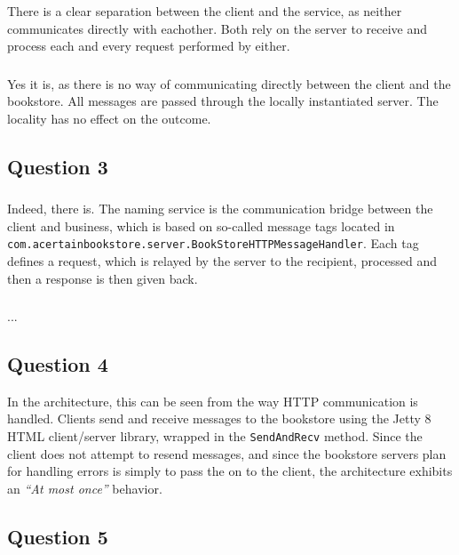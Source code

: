 \subsubsection{}
There is a clear separation between the client and the service, as neither
communicates directly with eachother. Both rely on the server to receive and
process each and every request performed by either.

\subsubsection{}
Yes it is, as there is no way of communicating directly between the client and
the bookstore. All messages are passed through the locally instantiated server.
The locality has no effect on the outcome.

\subsection{Question 3}

\subsubsection{}
Indeed, there is. The naming service is the communication bridge between the
client and business, which is based on so-called message tags located in \\
{\tt com.acertainbookstore.server.BookStoreHTTPMessageHandler}. Each tag defines
a request, which is relayed by the server to the recipient, processed and then
a response is then given back.

\subsubsection{}
...

\subsection{Question 4}
In the architecture, this can be seen from the way HTTP communication is handled. Clients send and receive messages to the bookstore using the Jetty 8 HTML client/server library, wrapped in the {\tt SendAndRecv} method. Since the client does not attempt to resend messages, and since the bookstore servers plan for handling errors is simply to pass the on to the client, the architecture exhibits an {\it ``At most once''} behavior.

\subsection{Question 5}

